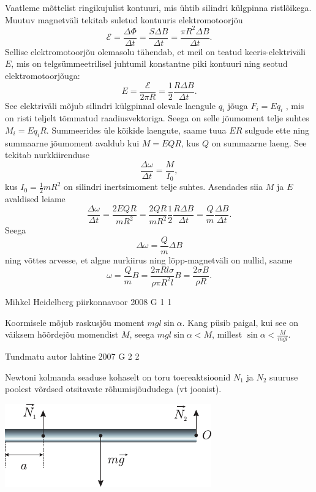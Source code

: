 \documentclass[11pt]{article}
\begin{document}
{{\ifSolution
Vaatleme mõttelist ringikujulist kontuuri, mis ühtib silindri külgpinna ristlõikega. Muutuv magnetväli tekitab suletud kontuuris elektromotoorjõu
\[
\mathcal{E}=\frac{\Delta \Phi}{\Delta t}=\frac{S \Delta B}{\Delta t}=\frac{\pi R^{2} \Delta B}{\Delta t}.
\]
Sellise elektromotoorjõu olemasolu tähendab, et meil on teatud keeris-elektriväli $E$, mis on telgsümmeetrilisel juhtumil konstantne piki kontuuri ning seotud elektromotoorjõuga:
\[
E=\frac{\mathcal{E}}{2 \pi R}=\frac{1}{2} \frac{R \Delta B}{\Delta t}.
\]
See elektriväli mõjub silindri külgpinnal olevale laengule $q_i$ jõuga $F_i = Eq_i$ , mis on risti teljelt tõmmatud raadiusvektoriga. Seega on selle jõumoment telje suhtes $M_i = Eq_iR$. Summeerides üle kõikide laengute, saame tuua $ER$ sulgude ette ning summaarne jõumoment avaldub kui $M = EQR$, kus $Q$ on summaarne laeng. See tekitab nurkkiirenduse
\[
\frac{\Delta \omega}{\Delta t}=\frac{M}{I_{0}},
\]
kus $I_0 = \frac{1}{2}mR^2$ on silindri inertsimoment telje suhtes. Asendades siia $M$ ja $E$ avaldised leiame
\[
\frac{\Delta \omega}{\Delta t}=\frac{2 E Q R}{m R^{2}}=\frac{2 Q R}{m R^{2}} \frac{1}{2} \frac{R \Delta B}{\Delta t}=\frac{Q}{m} \frac{\Delta B}{\Delta t}.
\]
Seega
\[
\Delta \omega=\frac{Q}{m} \Delta B
\]
ning võttes arvesse, et algne nurkiirus ning lõpp-magnetväli on nullid, saame
\[
\omega=\frac{Q}{m} B=\frac{2 \pi R l \sigma}{\rho \pi R^{2} l} B=\frac{2 \sigma B}{\rho R}.
\]
\fi
}

{Mihkel Heidelberg} %
{piirkonnavoor} %
{2008} %
{G 1} %
{1} %
{

\ifSolution
Koormisele mõjub raskusjõu moment $mgl\sin \alpha$. Kang püsib paigal, kui see on väiksem hõõrdejõu momendist $M$, seega $mgl\sin \alpha < M$, millest $\sin \alpha < \frac{M}{mgl}$.
\fi
}

{Tundmatu autor} %
{lahtine} %
{2007} %
{G 2} %
{2} %
{

\ifSolution
Newtoni kolmanda seaduse kohaselt on toru toereaktsioonid $N_1$ ja $N_2$ suuruse poolest võrdsed otsitavate rõhumisjõududega (vt joonist).

\begin{center}
	\includegraphics[width=0.6\linewidth]{2007-lahg-02-lah}
\end{center}

}}
\end{document}

